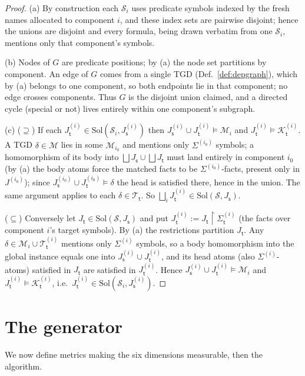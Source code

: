 \documentclass{amsart}
\theoremstyle{definition}
\newcommand{\Tbox}{\mathcal{T}}
\newcommand{\KB}{\mathcal{K}}
\newcommand{\Sig}{\Sigma}
\newcommand{\Map}{\mathcal{M}}
\newcommand{\src}{\mathsf{s}}
\newcommand{\trg}{\mathsf{t}}
\newcommand{\Scn}{\mathcal{S}}
\begin{document}
\begin{proof}
(a) By construction each $\Scn_i$ uses predicate symbols indexed by the fresh
names allocated to component $i$, and these index sets are pairwise disjoint;
hence the unions are disjoint and every formula, being drawn verbatim from one
$\Scn_i$, mentions only that component's symbols.

(b) Nodes of $G$ are predicate positions; by (a) the node set partitions by
component. An edge of $G$ comes from a single TGD (Def.~\ref{def:depgraph}),
which by (a) belongs to one component, so both endpoints lie in that component;
no edge crosses components. Thus $G$ is the disjoint union claimed, and a
directed cycle (special or not) lives entirely within one component's subgraph.

(c) ($\supseteq$) If each $J_\trg^{(i)}\in\mathrm{Sol}(\Scn_i,J_\src^{(i)})$ then
$J_\src^{(i)}\cup J_\trg^{(i)}\models\Map_i$ and
$J_\trg^{(i)}\models\KB_\trg^{(i)}$. A TGD $\delta\in\Map$ lies in some
$\Map_{i_0}$ and mentions only $\Sig^{(i_0)}$ symbols; a homomorphism of its body
into $\bigsqcup J_\src\cup\bigsqcup J_\trg$ must land entirely in component $i_0$
(by (a) the body atoms force the matched facts to be $\Sig^{(i_0)}$-facts, present
only in $J^{(i_0)}$); since $J_\src^{(i_0)}\cup J_\trg^{(i_0)}\models\delta$ the
head is satisfied there, hence in the union. The same argument applies to each
$\delta\in\Tbox_\trg$. So $\bigsqcup_i J_\trg^{(i)}\in\mathrm{Sol}(\Scn,J_\src)$.

($\subseteq$) Conversely let $J_\trg\in\mathrm{Sol}(\Scn,J_\src)$ and put
$J_\trg^{(i)}:=J_\trg\!\restriction\!\Sig_\trg^{(i)}$ (the facts over component
$i$'s target symbols). By (a) the restrictions partition $J_\trg$. Any
$\delta\in\Map_i\cup\Tbox_\trg^{(i)}$ mentions only $\Sig^{(i)}$ symbols, so a
body homomorphism into the global instance equals one into
$J_\src^{(i)}\cup J_\trg^{(i)}$, and its head atoms (also $\Sig^{(i)}$-atoms)
satisfied in $J_\trg$ are satisfied in $J_\trg^{(i)}$. Hence
$J_\src^{(i)}\cup J_\trg^{(i)}\models\Map_i$ and
$J_\trg^{(i)}\models\KB_\trg^{(i)}$, i.e.\
$J_\trg^{(i)}\in\mathrm{Sol}(\Scn_i,J_\src^{(i)})$.
\end{proof}

\section{The generator}\label{sec:gen}

We now define metrics making the six dimensions measurable, then the algorithm.
\end{document}
